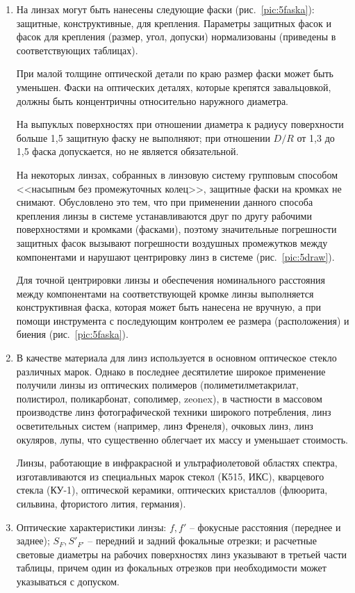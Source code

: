 \begin{enumerate}
\item На линзах могут быть нанесены следующие фаски (рис.~\ref{pic:5faska}): защитные, конструктивные, для крепления. Параметры защитных фасок и фасок для крепления (размер, угол, допуски) нормализованы (приведены в соответствующих таблицах).

При малой толщине оптической детали по краю размер фаски может быть уменьшен. Фаски на оптических деталях, которые крепятся завальцовкой, должны быть концентричны относительно наружного диаметра.

На выпуклых поверхностях при отношении диаметра к радиусу поверхности больше 1,5 защитную фаску не выполняют; при отношении $ D/R $ от 1,3 до 1,5 фаска допускается, но не является обязательной.

На некоторых линзах, собранных в линзовую систему групповым способом <<насыпным без промежуточных колец>>, защитные фаски на кромках не снимают. Обусловлено это тем, что при применении данного способа крепления линзы в системе устанавливаются друг по другу рабочими поверхностями и кромками (фасками), поэтому значительные погрешности защитных фасок вызывают погрешности воздушных промежутков между компонентами и нарушают центрировку линз в системе (рис.~\ref{pic:5draw}).

Для точной центрировки линзы и обеспечения номинального расстояния между компонентами на соответствующей кромке линзы выполняется конструктивная фаска, которая может быть нанесена не вручную, а при помощи инструмента с последующим контролем ее размера (расположения) и биения (рис.~\ref{pic:5faska}).

\item В качестве материала для линз используется в основном оптическое стекло различных марок. Однако в последнее десятилетие широкое применение получили линзы из оптических полимеров (полиметилметакрилат, полистирол, поликарбонат, сополимер, zeonex), в частности в массовом производстве линз фотографической техники широкого потребления, линз осветительных систем (например, линз Френеля), очковых линз, линз окуляров, лупы, что существенно облегчает их массу и уменьшает стоимость.

Линзы, работающие в инфракрасной и ультрафиолетовой областях спектра, изготавливаются из специальных марок стекол (К515, ИКС), кварцевого стекла (КУ-1), оптической керамики, оптических кристаллов (флюорита, сильвина, фтористого лития, германия).

\item Оптические характеристики линзы: $ f, f' $ -- фокусные расстояния (переднее и заднее); $ S_F, S'_{F'} $  -- передний и задний фокальные отрезки; и расчетные световые диаметры на рабочих поверхностях линз указывают в третьей части таблицы, причем один из фокальных отрезков при необходимости может указываться с допуском.


\end{enumerate}
